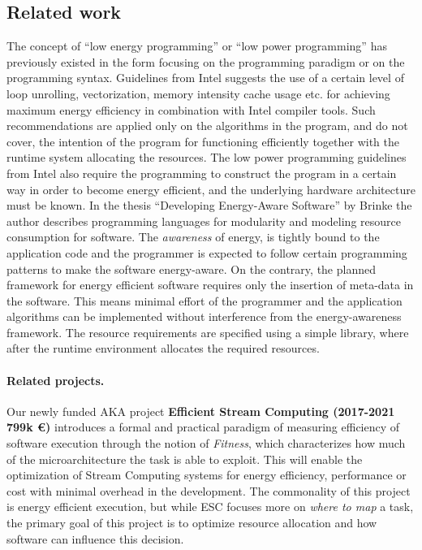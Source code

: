 \documentclass{article}
\begin{document}
\subsection{Related work}
The concept of ``low energy programming'' or ``low power programming'' has previously existed in the form focusing on the programming paradigm or on the programming syntax. 
Guidelines from Intel \cite{IntelLowPower} suggests the use of a certain level of loop unrolling, vectorization, memory intensity cache usage etc.
for achieving maximum energy efficiency in combination with Intel compiler tools. 
Such recommendations are applied only on the algorithms in the program, and do not cover, the intention of the program for functioning efficiently together with the runtime system allocating the resources. 
The low power programming guidelines from Intel also require the programming to construct the program in a certain way in order to become energy efficient, 
and the underlying hardware architecture must be known. 
In the thesis ``Developing Energy-Aware Software'' by Brinke \cite{Brinke:15} the author describes programming languages for modularity and modeling resource consumption for software.
The \textit{awareness} of energy, is tightly bound to the application code and the programmer is expected to follow certain programming patterns to make the software energy-aware.
On the contrary, the planned framework for energy efficient software requires only the insertion of meta-data in the software.
This means minimal effort of the programmer and the application algorithms can be implemented without interference from the energy-awareness framework.
The resource requirements are specified using a simple library, where after the runtime environment allocates the required resources.\smallskip

\paragraph{Related projects.}
Our newly funded AKA project \textbf{Efficient Stream Computing (2017-2021 799k \euro)} introduces a formal and practical paradigm of measuring efficiency of software execution through the notion of \textit{Fitness},
which characterizes how much of the microarchitecture the task is able to exploit.
This will enable the optimization of Stream Computing systems for energy efficiency, performance or cost with minimal overhead in the development.
The commonality of this project is energy efficient execution, but while ESC focuses more on \textit{where to map} a task, the primary goal of this project is to optimize resource allocation and how software can influence this decision. \smallskip
\end{document}
